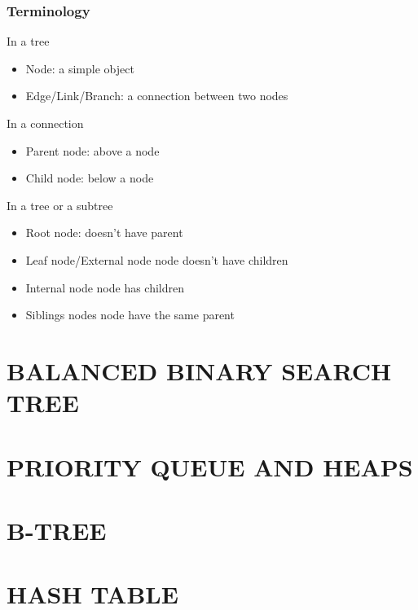 \documentclass{article}
\begin{document}
\subsubsection{Terminology}
In a tree
\begin{itemize}
    \item Node: a simple object
    \item Edge/Link/Branch: a connection between two nodes
\end{itemize}

In a connection
\begin{itemize}
    \item Parent node: above a node
    \item Child node: below a node
\end{itemize}

In a tree or a subtree
\begin{itemize}
    \item Root node: doesn't have parent
    \item Leaf node/External node node doesn't have children
    \item Internal node node has children
    \item Siblings nodes node have the same parent
\end{itemize}

\section{BALANCED BINARY SEARCH TREE}
\section{PRIORITY QUEUE AND HEAPS}
\section{B-TREE}
\section{HASH TABLE}
\end{document}
